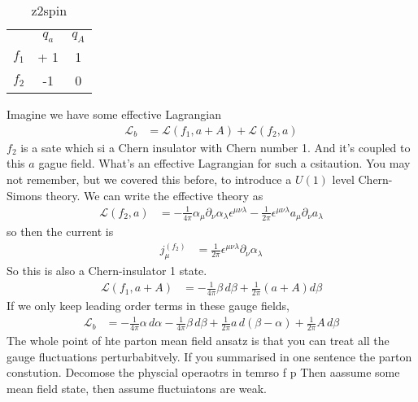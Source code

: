 \begin{table}[h]
    \centering
    \begin{tabular}{ccc}
        & $q_a$ & $q_A$\\
        $f_1$ & + 1 &  1\\
        $f_2$ & -1 & 0
    \end{tabular}
    \caption{z2spin}
    \label{tab:z2spin}
\end{table}
Imagine we have some effective Lagrangian
\begin{align}
    \mathcal{L}_b
    &=
    \mathcal{L}\left( f_1, a + A \right)
    +
    \mathcal{L}\left( f_2, a \right)
\end{align}
$f_2$ is a sate which si a Chern insulator with Chern number 1.
And it's coupled to this $a$ gague field.
What's an effective Lagrangian for such a csitaution.
You may not remember,
but we covered this before,
to introduce a $U(1)$ level Chern-Simons theory.
We can write the effective theory as
\begin{align}
    \mathcal{L}\left( f_2, a \right)
    &=
    -\frac{1}{4\pi}
    \alpha_{\mu} \partial_{\nu} \alpha_{\lambda}
    \epsilon^{\mu\nu\lambda}
    -
    \frac{1}{2\pi}
    \epsilon^{\mu\nu\lambda}
    a_{\mu} \partial_{\nu} a_{\lambda}
\end{align}
so then the current is
\begin{align}
    j_{\mu}^{\left( f_2 \right)}
    &=
    \frac{1}{2\pi}
    \epsilon^{\mu\nu\lambda}
    \partial_\nu
    \alpha_{\lambda}
\end{align}
So this is also a Chern-insulator 1 state.
\begin{align}
    \mathcal{L}\left( f_1, a + A \right)
    &=
    -\frac{1}{4\pi}
    \beta \, d\beta
    +
    \frac{1}{2\pi}
    \left( a + A \right)
    d\beta
\end{align}
If we only keep leading order terms in these gauge fields,
\begin{align}
    \mathcal{L}_b
    &=
    -\frac{1}{4\pi}
    \alpha\, d\alpha
    -
    \frac{1}{4\pi}
    \beta\, d\beta
    +
    \frac{1}{2\pi}
    a\, d\left( \beta - \alpha \right)
    +
    \frac{1}{2\pi} A\, d\beta
\end{align}
The whole point of hte parton mean field ansatz is that you can treat all the
gauge fluctuations perturbabitvely.
If you summarised in one sentence the parton constution.
Decomose the physcial operaotrs in temrso f p
Then aassume some mean field state,
then assume fluctuiatons are weak.

